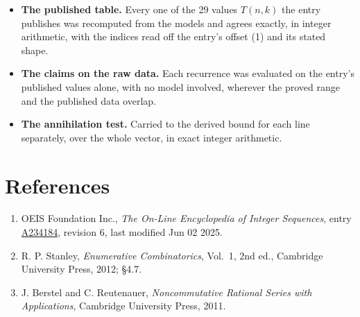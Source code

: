 \documentclass[11pt]{article}
\theoremstyle{definition}
\begin{document}
\begin{itemize}

\item {\bfseries The published table.} Every one of the 29 values $T(n,k)$ the entry publishes was recomputed from the models and agrees exactly, in integer arithmetic, with the indices read off the entry's offset (1) and its stated shape.

\item {\bfseries The claims on the raw data.} Each recurrence was evaluated on the entry's published values alone, with no model involved, wherever the proved range and the published data overlap.

\item {\bfseries The annihilation test.} Carried to the derived bound for each line separately, over the whole vector, in exact integer arithmetic.

\end{itemize}

\section{References}

\begin{enumerate}

\item OEIS Foundation Inc., \emph{The On-Line Encyclopedia of Integer Sequences}, entry \href{https://oeis.org/A234184}{A234184}, revision 6, last modified Jun 02 2025.

\item R. P. Stanley, \emph{Enumerative Combinatorics}, Vol.~1, 2nd ed., Cambridge University Press, 2012; \S4.7.

\item J. Berstel and C. Reutenauer, \emph{Noncommutative Rational Series with Applications}, Cambridge University Press, 2011.

\end{enumerate}
\end{document}
